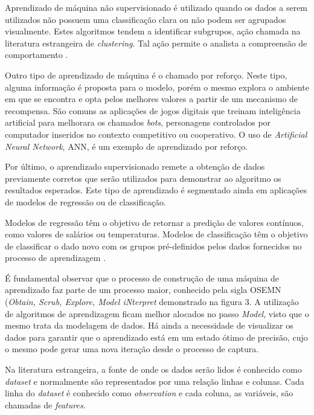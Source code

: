 \documentclass[conference]{IEEEtran}
\begin{document}
Aprendizado de máquina não supervisionado é utilizado quando os dados a serem utilizados não possuem uma classificação clara ou não podem ser agrupados visualmente. Estes algoritmos tendem a identificar subgrupos, ação chamada na literatura estrangeira de \textit{clustering}. Tal ação permite o analista a compreensão de comportamento \cite{pythonmachinelearning}.

Outro tipo de aprendizado de máquina é o chamado por reforço. Neste tipo, alguma informação é proposta para o modelo, porém o mesmo explora o ambiente em que se encontra e opta pelos melhores valores a partir de um mecanismo de recompensa\cite{pythonmachinelearning}. São comuns as aplicações de jogos digitais que treinam inteligência artificial para melhorara os chamados \textit{bots}, personagens controlados por computador inseridos no contexto competitivo ou cooperativo. O uso de \textit{Artificial Neural Network}, ANN, é um exemplo de aprendizado por reforço.

Por último, o aprendizado supervisionado remete a obtenção de dados previamente corretos que serão utilizados para demonstrar ao algoritmo os resultados esperados. Este tipo de aprendizado é segmentado ainda em aplicações de modelos de regressão ou de classificação.

Modelos de regressão têm o objetivo de retornar a predição de valores contínuos, como valores de salários ou temperaturas. Modelos de classificação têm o objetivo de classificar o dado novo com os grupos pré-definidos pelos dados fornecidos no processo de aprendizagem \cite{pythonmachinelearning}.

É fundamental observar que o processo de construção de uma máquina de aprendizado faz parte de um processo maior, conhecido pela sigla OSEMN (\textit{Obtain, Scrub, Explore, Model iNterpret} \cite{pythondatascience} demonstrado na figura 3. A utilização de algoritmos de aprendizagem ficam melhor alocados no passo \textit{Model}, visto que o mesmo trata da modelagem de dados. Há ainda a necessidade de visualizar os dados para garantir que o aprendizado está em um estado ótimo de precisão, cujo o mesmo pode gerar uma nova iteração desde o processo de captura.

Na literatura estrangeira, a fonte de onde os dados serão lidos é conhecido como \textit{dataset} e normalmente são representados por uma relação linhas e colunas. Cada linha do \textit{dataset} é conhecido como \textit{observation} e cada coluna, as variáveis, são chamadas de \textit{features}.
\end{document}
